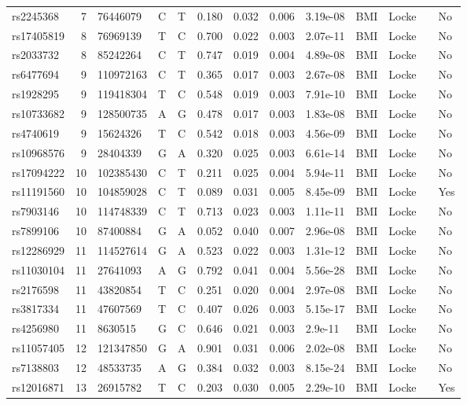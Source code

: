 \documentclass[11pt,twoside]{bristolthesis}
\begin{document}
\begin{longtable}[t]{lrlllrrrlllll}
rs2245368 & 7 & 76446079 & C & T & 0.180 & 0.032 & 0.006 & 3.19e-08 & BMI & Locke &  & No\\
rs17405819 & 8 & 76969139 & T & C & 0.700 & 0.022 & 0.003 & 2.07e-11 & BMI & Locke &  & No\\
rs2033732 & 8 & 85242264 & C & T & 0.747 & 0.019 & 0.004 & 4.89e-08 & BMI & Locke &  & No\\
\addlinespace
rs6477694 & 9 & 110972163 & C & T & 0.365 & 0.017 & 0.003 & 2.67e-08 & BMI & Locke &  & No\\
rs1928295 & 9 & 119418304 & T & C & 0.548 & 0.019 & 0.003 & 7.91e-10 & BMI & Locke &  & No\\
rs10733682 & 9 & 128500735 & A & G & 0.478 & 0.017 & 0.003 & 1.83e-08 & BMI & Locke &  & No\\
rs4740619 & 9 & 15624326 & T & C & 0.542 & 0.018 & 0.003 & 4.56e-09 & BMI & Locke &  & No\\
rs10968576 & 9 & 28404339 & G & A & 0.320 & 0.025 & 0.003 & 6.61e-14 & BMI & Locke &  & No\\
\addlinespace
rs17094222 & 10 & 102385430 & C & T & 0.211 & 0.025 & 0.004 & 5.94e-11 & BMI & Locke &  & No\\
rs11191560 & 10 & 104859028 & C & T & 0.089 & 0.031 & 0.005 & 8.45e-09 & BMI & Locke &  & Yes\\
rs7903146 & 10 & 114748339 & C & T & 0.713 & 0.023 & 0.003 & 1.11e-11 & BMI & Locke &  & No\\
rs7899106 & 10 & 87400884 & G & A & 0.052 & 0.040 & 0.007 & 2.96e-08 & BMI & Locke &  & No\\
rs12286929 & 11 & 114527614 & G & A & 0.523 & 0.022 & 0.003 & 1.31e-12 & BMI & Locke &  & No\\
\addlinespace
rs11030104 & 11 & 27641093 & A & G & 0.792 & 0.041 & 0.004 & 5.56e-28 & BMI & Locke &  & No\\
rs2176598 & 11 & 43820854 & T & C & 0.251 & 0.020 & 0.004 & 2.97e-08 & BMI & Locke &  & No\\
rs3817334 & 11 & 47607569 & T & C & 0.407 & 0.026 & 0.003 & 5.15e-17 & BMI & Locke &  & No\\
rs4256980 & 11 & 8630515 & G & C & 0.646 & 0.021 & 0.003 & 2.9e-11 & BMI & Locke &  & No\\
rs11057405 & 12 & 121347850 & G & A & 0.901 & 0.031 & 0.006 & 2.02e-08 & BMI & Locke &  & No\\
\addlinespace
rs7138803 & 12 & 48533735 & A & G & 0.384 & 0.032 & 0.003 & 8.15e-24 & BMI & Locke &  & No\\
rs12016871 & 13 & 26915782 & T & C & 0.203 & 0.030 & 0.005 & 2.29e-10 & BMI & Locke &  & Yes\\

\end{longtable}
\end{document}
